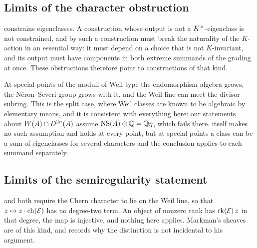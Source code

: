 \subsection{Limits of the character obstruction}

\begin{remark}\label{rem:nonequivariant}
 constrains eigenclasses. A construction whose output is
not a $K^{\times}$-eigenclass is not constrained, and by 
such a construction must break the naturality of the $K$-action in an
essential way: it must depend on a choice that is not $K$-invariant, and its
output must have components in both extreme summands of the grading at once.
These obstructions therefore point to constructions of that kind.
\end{remark}

\begin{remark}\label{rem:special}
At special points of the moduli of Weil type the endomorphism algebra grows,
the N\'eron--Severi group grows with it, and the Weil line can meet the divisor
subring. This is the split case, where Weil classes are known to be algebraic
by elementary means, and it is consistent with everything here: our statements
about $W(A)\cap D^{2n}(A)$ assume $\mathrm{NS}(A)\otimes\mathbb{Q}=\mathbb{Q}\eta$, which fails
there.  itself makes no such assumption and holds at every
point, but at special points a class can be a sum of eigenclasses for several
characters and the conclusion applies to each summand separately.
\end{remark}

\subsection{Limits of the semiregularity statement}

\begin{remark}\label{rem:positiverankscope}
 and  both require the Chern character to
lie on the Weil line, so that $z\mapsto z\cdot\operatorname{ch}(\mathcal{E})$ has no degree-two
term. An object of nonzero rank has $\operatorname{rk}(\mathcal{E})\,z$ in that degree, the map is
injective, and nothing here applies. Markman's sheaves are of this kind, and
 records why the distinction is not incidental to his
argument.
\end{remark}


